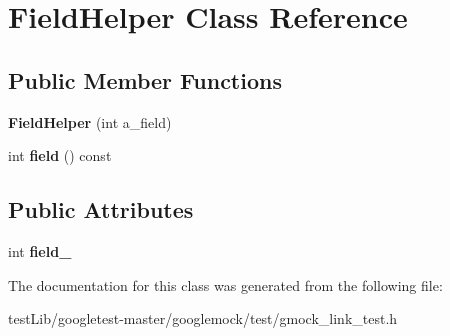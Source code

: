 \hypertarget{classFieldHelper}{}\section{Field\+Helper Class Reference}
\label{classFieldHelper}
\subsection*{Public Member Functions}
\begin{DoxyCompactItemize}
\item 
\mbox{\label{classFieldHelper_a06729cbd5da2993e8007cb62f1d00b3a}} 
{\bfseries Field\+Helper} (int a\+\_\+field)
\item 
\mbox{\label{classFieldHelper_af2959e142813205aeeb4d2ad27430ad3}} 
int {\bfseries field} () const
\end{DoxyCompactItemize}
\subsection*{Public Attributes}
\begin{DoxyCompactItemize}
\item 
\mbox{\label{classFieldHelper_a50a7ec9efc60377363d5ce8bea1708ac}} 
int {\bfseries field\+\_\+}
\end{DoxyCompactItemize}


The documentation for this class was generated from the following file\+:\begin{DoxyCompactItemize}
\item 
test\+Lib/googletest-\/master/googlemock/test/gmock\+\_\+link\+\_\+test.\+h\end{DoxyCompactItemize}
